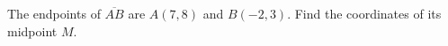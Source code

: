 The endpoints of $\overline{AB}$ are $A(7,8)$ and $B(-2,3)$. Find the coordinates of its midpoint $M$.
